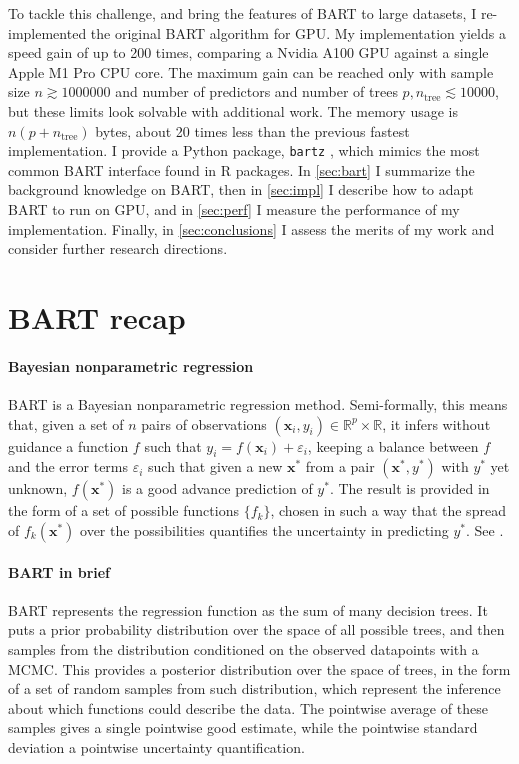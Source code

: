 \documentclass{article}
\begin{document}
    To tackle this challenge, and bring the features of BART to large datasets, I re-implemented the original BART algorithm for GPU. My implementation yields a speed gain of up to 200 times, comparing a Nvidia A100 GPU against a single Apple M1 Pro CPU core. The maximum gain can be reached only with sample size $n \gtrsim \num{1000000}$ and  number of predictors and number of trees $p,n_\text{tree}\lesssim\num{10000}$, but these limits look solvable with additional work. The memory usage is $n(p+n_\text{tree})$ bytes, about 20 times less than the previous fastest implementation. I provide a Python package,
    \texttt{bartz}
    \citep{petrillo2024b}%
    , which mimics the most common BART interface found in R packages. In \autoref{sec:bart} I summarize the background knowledge on BART, then in \autoref{sec:impl} I describe how to adapt BART to run on GPU, and in \autoref{sec:perf} I measure the performance of my implementation. Finally, in \autoref{sec:conclusions} I assess the merits of my work and consider further research directions.

    \section{BART recap}
    \label{sec:bart}

    \paragraph{Bayesian nonparametric regression}

    BART is a Bayesian nonparametric regression method. Semi-formally, this means that, given a set of $n$ pairs of observations $(\mathbf x_i,y_i) \in \mathbb R^p \times \mathbb R$, it infers without guidance a function $f$ such that $y_i = f(\mathbf x_i) + \varepsilon_i$, keeping a balance between $f$ and the error terms $\varepsilon_i$ such that given a new $\mathbf x^*$ from a pair $(\mathbf x^*, y^*)$ with $y^*$ yet unknown, $f(\mathbf x^*)$ is a good advance prediction of $y^*$. The result is provided in the form of a set of possible functions $\{f_k\}$, chosen in such a way that the spread of $f_k(\mathbf x^*)$ over the possibilities quantifies the uncertainty in predicting $y^*$. See \citet[ch.~4]{muller2015}.

    \paragraph{BART in brief}

    BART represents the regression function as the sum of many decision trees. It puts a prior probability distribution over the space of all possible trees, and then samples from the distribution conditioned on the observed datapoints with a MCMC. This provides a posterior distribution over the space of trees, in the form of a set of random samples from such distribution, which represent the inference about which functions could describe the data. The pointwise average of these samples gives a single pointwise good estimate, while the pointwise standard deviation a pointwise uncertainty quantification.
\end{document}
